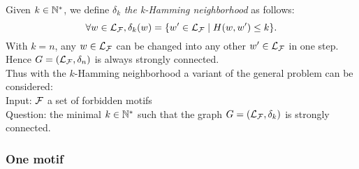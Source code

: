 \documentclass{article}
\begin{document}
Given $k \in \mathbb{N}^*$, we define $\delta_k$ {\it the k-Hamming neighborhood} as follows:
$$\forall w \in \mathcal{L}_{\mathcal{F}},  \delta_k(w) = \{w'\in \mathcal{L}_{\mathcal{F}} \mid H(w,w')\le k\}. $$
With $k = n$, any $w \in \mathcal{L}_{\mathcal{F}}$ can be changed into any other $w' \in \mathcal{L}_{\mathcal{F}}$ in one step. Hence $G = (\mathcal{L}_{\mathcal{F}}, \delta_n)$ is always strongly connected. \\
Thus with the $k$-Hamming neighborhood a variant of the general problem can be considered: \\
\newline
Input: $\mathcal{F}$ a set of forbidden motifs \\
Question: the minimal $k \in \mathbb{N}^*$ such that the graph $G = (\mathcal{L}_{\mathcal{F}}, \delta_k)$ is strongly connected.


\subsubsection{One motif}
\end{document}
